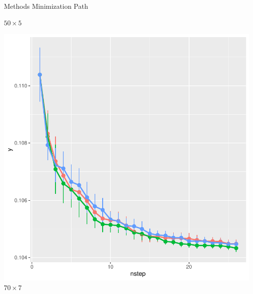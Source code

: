 \documentclass{beamer}
\begin{document}
\begin{frame}{Methods Minimization Path}
\begin{minipage}{0.32\textwidth}
\small {$50\times 5$}
\end{minipage}
\begin{minipage}{0.32\textwidth}
\centering
\includegraphics[]{../chapters/RSO/pdfs/results70x7}
\small {$70\times 7$}
\end{minipage}
\end{frame}
\end{document}
